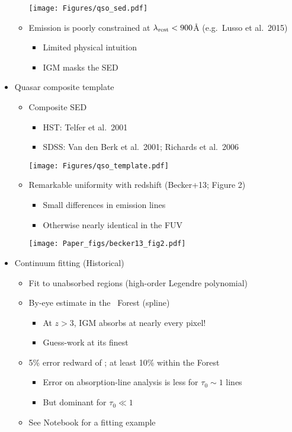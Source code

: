 \documentclass[12pt,letterpaper]{article}
\begin{document}
\begin{Aenumerate}
\begin{itemize}
\begin{itemize}
	\texttt{[image: Figures/qso\_sed.pdf]}

 	\item Emission is poorly constrained at $\lambda_{\rm rest} < 900$\AA
 	(e.g.\ Lusso et al.\ 2015)
 		\begin{itemize}
 		\item Limited physical intuition
 		\item IGM masks the SED
 		\end{itemize}
 	\end{itemize}

 \item Quasar composite template
 	\begin{itemize}
 	\item Composite SED 
 		\begin{itemize}
 		\item HST: Telfer et al.\ 2001
 		\item SDSS: Van den Berk et al.\ 2001; Richards et al.\ 2006
 		\end{itemize}

	\texttt{[image: Figures/qso\_template.pdf]}

 	\item Remarkable uniformity with redshift (Becker+13; Figure 2)
 		\begin{itemize}
 		\item Small differences in emission lines
 		\item Otherwise nearly identical in the FUV
 		\end{itemize}

	\texttt{[image: Paper\_figs/becker13\_fig2.pdf]}

 	\end{itemize}

 \item Continuum fitting (Historical)
 	\begin{itemize}
 	\item Fit to unabsorbed regions (high-order Legendre polynomial)
 	\item By-eye estimate in the \lya\ Forest (spline)
 		\begin{itemize}
 		\item At $z>3$, IGM absorbs at nearly every pixel!
 		\item Guess-work at its finest
 		\end{itemize}
 	\item 5\% error redward of \lya; at least 10\% within the Forest
 		\begin{itemize}
 		\item Error on absorption-line analysis is less for $\tau_0 \sim 1$ lines
 		\item But dominant for $\tau_0 \ll 1$
 		\end{itemize}
 	\item See Notebook for a fitting example
 	\end{itemize}


\end{itemize}
\end{Aenumerate}
\end{document}
